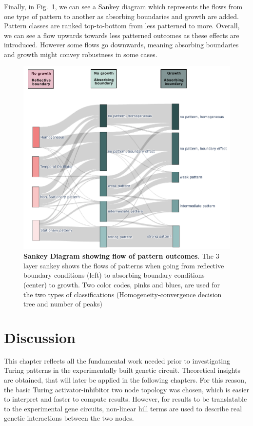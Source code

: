 Finally, in Fig.~\ref{fig:3layer_sankey}, we can see a Sankey diagram which represents the flows from one type of pattern to another as absorbing boundaries and growth are added. Pattern classes are ranked top-to-bottom from less patterned to more.
Overall, we can see a flow upwards towards less patterned outcomes as these effects are introduced.
However some flows go downwards, meaning absorbing boundaries and growth might convey robustness in some cases.

\begin{figure}[H] %
    \centering
    \begin{adjustbox}{center}
        \includegraphics[width=1\textwidth]{chapters/Chapter 1/3layer_sankey} %
    \end{adjustbox}
    \caption{\textbf{Sankey Diagram showing flow of pattern outcomes}. The 3 layer sankey shows the flows of patterns when going from reflective boundary conditions (left) to absorbing boundary conditions (center) to growth. Two color codes, pinks and blues, are used for the two types of classifications (Homogeneity-convergence decision tree and number of peaks) }
    \label{fig:3layer_sankey} %
\end{figure}


\section{Discussion}
This chapter reflects all the fundamental work needed prior to investigating Turing patterns in the experimentally built genetic circuit.
Theoretical insights are obtained, that will later be applied in the following chapters.
For this reason, the basic Turing activator-inhibitor two node topology was chosen, which is easier to interpret and faster to compute results.
However, for results to be translatable to the experimental gene circuits, non-linear hill terms are used to describe real genetic interactions between the two nodes.

